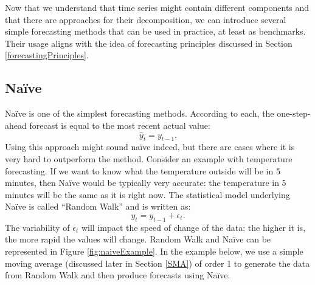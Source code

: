 \documentclass[
]{book}
\newenvironment{Shaded}{\begin{snugshade}}{\end{snugshade}}
\newcommand{\AttributeTok}[1]{\textcolor[rgb]{0.77,0.63,0.00}{#1}}
\newcommand{\ConstantTok}[1]{\textcolor[rgb]{0.00,0.00,0.00}{#1}}
\newcommand{\DecValTok}[1]{\textcolor[rgb]{0.00,0.00,0.81}{#1}}
\newcommand{\FunctionTok}[1]{\textcolor[rgb]{0.00,0.00,0.00}{#1}}
\newcommand{\NormalTok}[1]{#1}
\newcommand{\OtherTok}[1]{\textcolor[rgb]{0.56,0.35,0.01}{#1}}
\newcommand{\SpecialCharTok}[1]{\textcolor[rgb]{0.00,0.00,0.00}{#1}}
\newcommand{\StringTok}[1]{\textcolor[rgb]{0.31,0.60,0.02}{#1}}
\theoremstyle{definition}
\theoremstyle{definition}
\theoremstyle{definition}
\theoremstyle{definition}
\theoremstyle{remark}
\begin{document}
Now that we understand that time series might contain different components and that there are approaches for their decomposition, we can introduce several simple forecasting methods that can be used in practice, at least as benchmarks. Their usage aligns with the idea of forecasting principles discussed in Section \ref{forecastingPrinciples}.

\hypertarget{Naive}{%
\subsection{Naïve}\label{Naive}}

Naïve is one of the simplest forecasting methods. According to each, the one-step-ahead forecast is equal to the most recent actual value:
\begin{equation}
    \hat{y}_t = y_{t-1} .
    \label{eq:Naive}
\end{equation}
Using this approach might sound naïve indeed, but there are cases where it is very hard to outperform the method. Consider an example with temperature forecasting. If we want to know what the temperature outside will be in 5 minutes, then Naïve would be typically very accurate: the temperature in 5 minutes will be the same as it is right now. The statistical model underlying Naïve is called ``Random Walk'' and is written as:
\begin{equation}
    y_t = y_{t-1} + \epsilon_t.
    \label{eq:RandomWalk}
\end{equation}
The variability of \(\epsilon_t\) will impact the speed of change of the data: the higher it is, the more rapid the values will change. Random Walk and Naïve can be represented in Figure \ref{fig:naiveExample}. In the example below, we use a simple moving average (discussed later in Section \ref{SMA}) of order 1 to generate the data from Random Walk and then produce forecasts using Naïve.

\begin{Shaded}
\end{Shaded}
\end{document}
